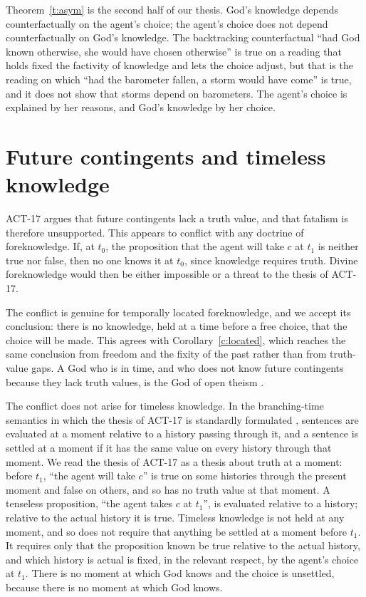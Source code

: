 \documentclass{situationist-preprint}
\begin{document}
Theorem~\ref{t:asym} is the second half of our thesis. God's knowledge depends counterfactually on the agent's choice; the agent's choice does not depend counterfactually on God's knowledge. The backtracking counterfactual \enquote{had God known otherwise, she would have chosen otherwise} is true on a reading that holds fixed the factivity of knowledge and lets the choice adjust, but that is the reading on which \enquote{had the barometer fallen, a storm would have come} is true, and it does not show that storms depend on barometers. The agent's choice is explained by her reasons, and God's knowledge by her choice.

\section{Future contingents and timeless knowledge}

ACT-17 argues that future contingents lack a truth value, and that fatalism is therefore unsupported. This appears to conflict with any doctrine of foreknowledge. If, at $t_0$, the proposition that the agent will take $c$ at $t_1$ is neither true nor false, then no one knows it at $t_0$, since knowledge requires truth. Divine foreknowledge would then be either impossible or a threat to the thesis of ACT-17.

The conflict is genuine for temporally located foreknowledge, and we accept its conclusion: there is no knowledge, held at a time before a free choice, that the choice will be made. This agrees with Corollary~\ref{c:located}, which reaches the same conclusion from freedom and the fixity of the past rather than from truth-value gaps. A God who is in time, and who does not know future contingents because they lack truth values, is the God of open theism \citep{Hasker1989}.

The conflict does not arise for timeless knowledge. In the branching-time semantics in which the thesis of ACT-17 is standardly formulated \citep{Prior1967,Thomason1970}, sentences are evaluated at a moment relative to a history passing through it, and a sentence is settled at a moment if it has the same value on every history through that moment. We read the thesis of ACT-17 as a thesis about truth at a moment: before $t_1$, \enquote{the agent will take $c$} is true on some histories through the present moment and false on others, and so has no truth value at that moment. A tenseless proposition, \enquote{the agent takes $c$ at $t_1$}, is evaluated relative to a history; relative to the actual history it is true. Timeless knowledge is not held at any moment, and so does not require that anything be settled at a moment before $t_1$. It requires only that the proposition known be true relative to the actual history, and which history is actual is fixed, in the relevant respect, by the agent's choice at $t_1$. There is no moment at which God knows and the choice is unsettled, because there is no moment at which God knows.
\end{document}
